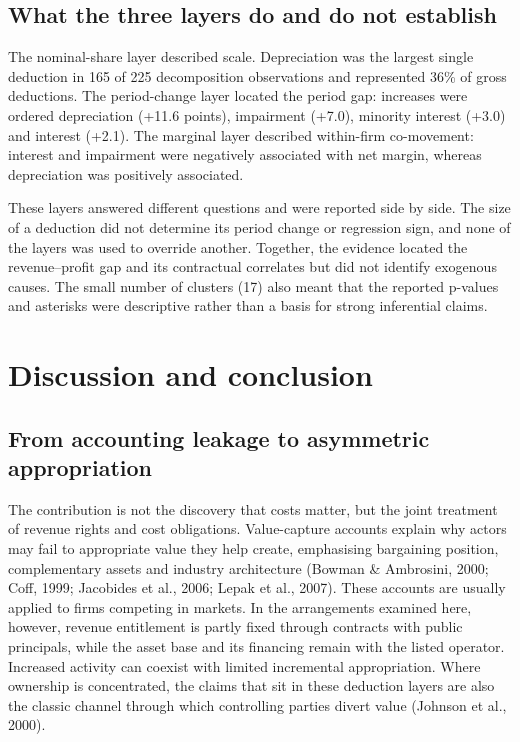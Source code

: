 \documentclass[review,3p,times]{elsarticle}
\begin{document}
\subsection{What the three layers do and do not establish}

The nominal-share layer described scale. Depreciation was the largest single deduction in 165 of 225 decomposition observations and represented 36\% of gross deductions. The period-change layer located the period gap: increases were ordered depreciation (+11.6 points), impairment (+7.0), minority interest (+3.0) and interest (+2.1). The marginal layer described within-firm co-movement: interest and impairment were negatively associated with net margin, whereas depreciation was positively associated.

These layers answered different questions and were reported side by side. The size of a deduction did not determine its period change or regression sign, and none of the layers was used to override another. Together, the evidence located the revenue--profit gap and its contractual correlates but did not identify exogenous causes. The small number of clusters (17) also meant that the reported p-values and asterisks were descriptive rather than a basis for strong inferential claims.

\section{Discussion and conclusion}

\subsection{From accounting leakage to asymmetric appropriation}

The contribution is not the discovery that costs matter, but the joint treatment of revenue rights and cost obligations. Value-capture accounts explain why actors may fail to appropriate value they help create, emphasising bargaining position, complementary assets and industry architecture (Bowman \& Ambrosini, 2000; Coff, 1999; Jacobides et al., 2006; Lepak et al., 2007). These accounts are usually applied to firms competing in markets. In the arrangements examined here, however, revenue entitlement is partly fixed through contracts with public principals, while the asset base and its financing remain with the listed operator. Increased activity can coexist with limited incremental appropriation. Where ownership is concentrated, the claims that sit in these deduction layers are also the classic channel through which controlling parties divert value (Johnson et al., 2000).
\end{document}
